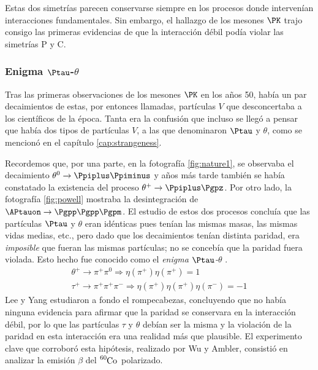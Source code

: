 Estas dos simetrías parecen conservarse siempre en los procesos donde intervenían interacciones fundamentales. Sin embargo, el hallazgo de los mesones $\PK$ trajo consigo las primeras evidencias de que la interacción débil podía violar las simetrías P y C.


\subsubsection{Enigma $\Ptau$-$\theta$}
Tras las primeras observaciones de los mesones $\PK$ en los años 50, había un par decaimientos de estas, por entonces llamadas, partículas $V$ que desconcertaba a los científicos de la época. Tanta era la confusión que incluso se llegó a pensar que había dos tipos de partículas $V$, a las que denominaron $\Ptau$ y $\theta$, como se mencionó en el capítulo \ref{cap:strangeness}. 

Recordemos que, por una parte, en la fotografía \ref{fig:nature1}, se observaba el decaimiento $\theta^{0} \rightarrow \Ppiplus\Ppiminus$ y años más tarde también se había constatado la existencia del proceso $\theta^{+} \rightarrow \Ppiplus\Pgpz$. Por otro lado, la fotografía \ref{fig:powell} mostraba la desintegración de $\APtauon \rightarrow \Pgpp\Pgpp\Pgpm$.  El estudio de estos dos procesos concluía que las partículas $\Ptau$ y $\theta$ eran idénticas pues tenían las mismas masas, las mismas vidas medias, etc., pero dado que los decaimientos tenían distinta paridad, era \textit{imposible} que fueran las mismas partículas; no se concebía que la paridad fuera violada. Esto hecho fue conocido como el \textit{enigma $\Ptau$-$\theta$} \cite{Ferbel}.
\begin{equation}
\begin{gathered}
\theta^{+} \rightarrow \pi^{+}\pi^{0} \Rightarrow \eta\left(\pi^{+}\right) \eta\left(\pi^{+}\right) = 1 \\ 
\tau^{+} \rightarrow \pi^{+}\pi^{+}\pi^{-} \Rightarrow \eta\left(\pi^{+}\right) \eta\left(\pi^{+}\right) \eta\left(\pi^{-}\right) = -1
\end{gathered}
\end{equation}
Lee y Yang estudiaron a fondo el rompecabezas, concluyendo que no había ninguna evidencia para afirmar que la paridad se conservara en la interacción débil, por lo que las partículas $\tau$ y $\theta$ debían ser la misma y la violación de la paridad en esta interacción era una realidad más que plausible. 
El experimento clave que corroboró esta hipótesis, realizado por Wu y Ambler, consistió en analizar la emisión $\beta$ del $\tensor*[^{60}]{\mathrm{Co}}{}$ polarizado.


